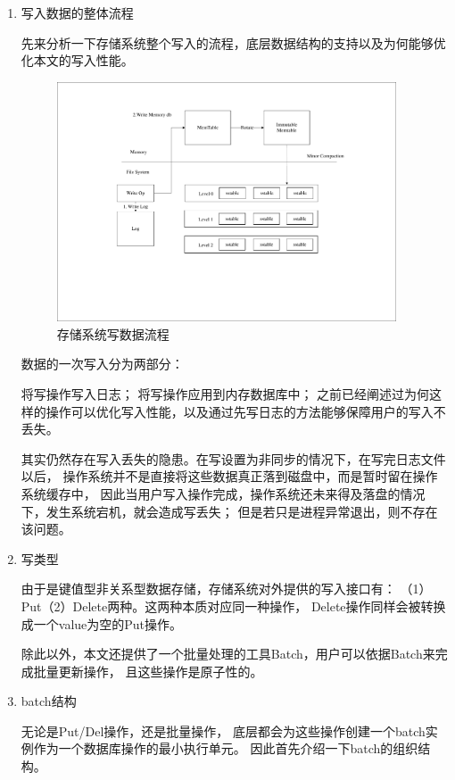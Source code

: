 		\begin{enumerate}
		\item 写入数据的整体流程
			
		先来分析一下存储系统整个写入的流程，底层数据结构的支持以及为何能够优化本文的写入性能。
		
		\begin{figure}[H]
			\centering
			\includegraphics[width=0.95\textwidth]{pdf/write_op.pdf}
			\caption{存储系统写数据流程}
			\label{write_op}
		\end{figure}

		数据的一次写入分为两部分：

		将写操作写入日志；
		将写操作应用到内存数据库中；
		之前已经阐述过为何这样的操作可以优化写入性能，以及通过先写日志的方法能够保障用户的写入不丢失。

		其实仍然存在写入丢失的隐患。在写设置为非同步的情况下，在写完日志文件以后，
		操作系统并不是直接将这些数据真正落到磁盘中，而是暂时留在操作系统缓存中，
		因此当用户写入操作完成，操作系统还未来得及落盘的情况下，发生系统宕机，就会造成写丢失；
		但是若只是进程异常退出，则不存在该问题。

		\item 写类型
		
		由于是键值型非关系型数据存储，存储系统对外提供的写入接口有：
		（1）Put（2）Delete两种。这两种本质对应同一种操作，
		Delete操作同样会被转换成一个value为空的Put操作。
	
		除此以外，本文还提供了一个批量处理的工具Batch，用户可以依据Batch来完成批量更新操作，
		且这些操作是原子性的。

		\item batch结构
		
		无论是Put/Del操作，还是批量操作，
		底层都会为这些操作创建一个batch实例作为一个数据库操作的最小执行单元。
		因此首先介绍一下batch的组织结构。


\end{enumerate}
